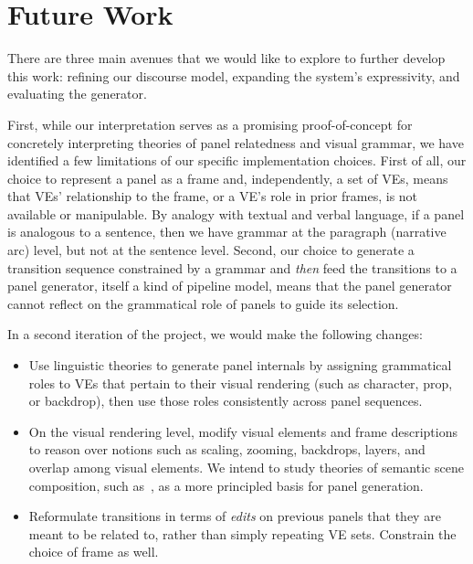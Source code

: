 \section{Future Work}

There are three main avenues that we would like to explore to further develop
this work: refining our discourse model, expanding the system's
expressivity, and evaluating the generator.

First, while our interpretation serves as a promising proof-of-concept for
concretely interpreting theories of panel relatedness and visual grammar,
we have identified a few limitations of our specific implementation
choices.  First of all, our choice to represent a panel as a frame and,
independently, a set of VEs, means that VEs' relationship to the frame, or
a VE's role in prior frames, is not available or manipulable.  By analogy
with textual and verbal language, if a panel is analogous to a sentence,
then we have grammar at the paragraph (narrative arc) level, but not at
the sentence level.  Second, our choice to generate a transition sequence
constrained by a grammar and {\em then} feed the transitions to a panel
generator, itself a kind of pipeline model, means that the panel generator
cannot reflect on the grammatical role of panels to guide its selection.

In a second iteration of the project, we would make the following changes:
\begin{itemize}
\item Use linguistic theories to generate panel internals by assigning
grammatical roles to VEs that pertain to their visual rendering (such as
character, prop, or backdrop), then use those roles consistently across
panel sequences.
\item On the visual rendering level, modify visual elements and frame
descriptions to reason over notions such as scaling, zooming, backdrops,
layers, and overlap among visual elements. We intend to study theories of
semantic scene composition, such as~\cite{zitnick2013bringing}, as a more
principled basis for panel generation.
\item Reformulate transitions in terms of {\em edits} on previous panels
that they are meant to be related to, rather than simply repeating VE sets.
Constrain the choice of frame as well.
\end{itemize}

